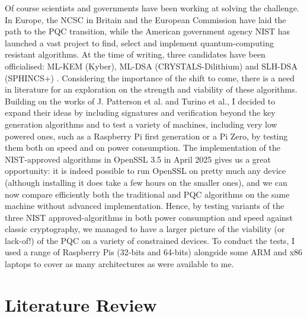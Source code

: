 \documentclass[11pt, letterpaper]{article}
\begin{document}
Of course scientists and governments have been working at solving the challenge. In Europe, the NCSC in Britain \cite{ncsc2025migrating} and the European Commission \cite{ec2025pqc} have laid the path to the PQC transition, while the American government agency NIST has launched a vast project to find, select and implement quantum-computing resistant algorithms. At the time of writing, three candidates have been officialised: ML-KEM (Kyber), ML-DSA (CRYSTALS-Dilithium) and SLH-DSA (SPHINCS+) \cite{csrc2024post}. 
Considering the importance of the shift to come, there is a need in literature for an exploration on the strength and viability of these algorithms. Building on the works of J. Patterson et al.\cite{patterson2025energy} and Turino et al.\cite{turino2025pqc}, I decided to expand their ideas by including signatures and verification beyond the key generation algorithms and to test a variety of machines, including very low powered ones, such as a Raspberry Pi first generation or a Pi Zero, by testing them both on speed and on power consumption.
The implementation of the NIST-approved algorithms in OpenSSL 3.5 in April 2025 \cite{openssl2025pqc} gives us a great opportunity: it is indeed possible to run OpenSSL on pretty much any device (although installing it does take a few hours on the smaller ones), and we can now compare efficiently both the traditional and PQC algorithms on the same machine without advanced implementation.
Hence, by testing variants of the three NIST approved-algorithms in both power consumption and speed against classic cryptography, we managed to have a larger picture of the viability (or lack-of!) of the PQC on a variety of constrained devices. To conduct the tests, I used a range of Raspberry Pis (32-bits and 64-bits) alongside some ARM and x86 laptops to cover as many architectures as were available to me.


\section{Literature Review}
\end{document}
